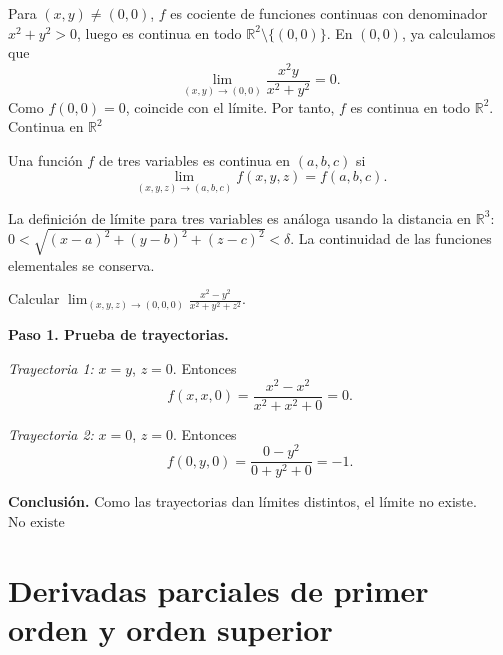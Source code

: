 \begin{myproof}
Para $(x,y)\neq(0,0)$, $f$ es cociente de funciones continuas con
denominador $x^2+y^2>0$, luego es continua en todo $\mathbb{R}^2\setminus\{(0,0)\}$.
En $(0,0)$, ya calculamos que
\[
\lim_{(x,y)\to(0,0)} \frac{x^2 y}{x^2+y^2}=0.
\]
Como $f(0,0)=0$, coincide con el límite. Por tanto, $f$ es continua
en todo $\mathbb{R}^2$. $\boxed{\text{Continua en } \mathbb{R}^2}$
\end{myproof}


\begin{definition}
Una función $f$ de tres variables es continua en $(a,b,c)$ si
\[
\lim_{(x,y,z)\to(a,b,c)} f(x,y,z) = f(a,b,c).
\]
\end{definition}

La definición de límite para tres variables es análoga usando la
distancia en $\mathbb{R}^3$: $0<\sqrt{(x-a)^2+(y-b)^2+(z-c)^2}<\delta$.
La continuidad de las funciones elementales se conserva.

\begin{example}
Calcular $\displaystyle\lim_{(x,y,z)\to(0,0,0)} \frac{x^2 - y^2}{x^2+y^2+z^2}$.
\end{example}

\begin{myproof}
\textbf{Paso 1. Prueba de trayectorias.}

\textit{Trayectoria 1:} $x=y$, $z=0$. Entonces
\[
f(x,x,0) = \frac{x^2 - x^2}{x^2+x^2+0} = 0.
\]

\textit{Trayectoria 2:} $x=0$, $z=0$. Entonces
\[
f(0,y,0) = \frac{0 - y^2}{0+y^2+0} = -1.
\]

\textbf{Conclusión.} Como las trayectorias dan límites distintos,
el límite no existe. $\boxed{\text{No existe}}$
\end{myproof}


\section{Derivadas parciales de primer orden y orden superior}

